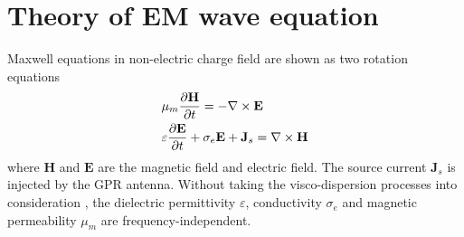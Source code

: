 \documentclass[pdftex,a4paper,parskip,listof=totoc,bibliography=totoc,onehalfspacing,12pt]{scrreprt}
\begin{document}
\section{Theory of EM wave equation}
Maxwell equations in non-electric charge field are shown as two rotation equations \citep{irving2006numerical}
\begin{equation}
\label{eqn:EM}
\begin{align*}
&\mu_{m} \pdv{ \mathbf{H}}{t} = -\nabla \times \mathbf{E} \\
&\varepsilon\pdv{ \mathbf{E}}{t} + \sigma_{e}\mathbf{E} + \mathbf{J}_s = \nabla \times \mathbf{H} 
\end{align*}
\end{equation}
where $\mathbf{H}$ and $\mathbf{E}$ are the magnetic field and  electric field. The source current $\mathbf{J}_s$ is injected by the GPR antenna. Without taking the visco-dispersion processes into consideration \citep{qin2020numerical2}, the dielectric permittivity $\varepsilon$, conductivity $\sigma_{e}$ and magnetic permeability $\mu_{m}$ are frequency-independent.
\end{document}
